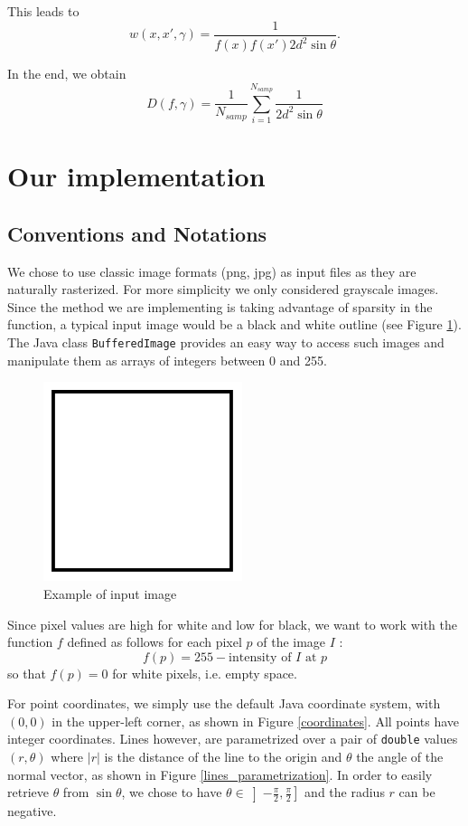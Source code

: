 \documentclass[10pt,a4paper]{article}                        %
\begin{document}
This leads to $$ w(x, x',\gamma) = \frac{1}{f(x)f(x')2d^2\sin\theta}. $$

In the end, we obtain
\begin{equation}
D(f,\gamma) = \frac{1}{N_{samp}} \sum_{i=1}^{N_{samp}}\frac{1}{2d^2\sin\theta}
\label{equation_finale}
\end{equation} 

        
        \section{Our implementation}

        \subsection {Conventions and Notations}
We chose to use classic image formats (png, jpg) as input files as they are naturally rasterized. For more simplicity we only considered grayscale images. Since the method we are implementing is taking advantage of sparsity in the function, a typical input image would be a black and white outline (see Figure \ref{exemple_carre}). The Java class \texttt{BufferedImage} provides an easy way to access such images and manipulate them as arrays of integers between 0 and 255. 
\begin{figure}[h]
\begin{center}
\includegraphics[scale=0.5]{img/carre.png}
\caption{Example of input image}
\label{exemple_carre}
\end{center}
\end{figure}

Since pixel values are high for white and low for black, we want to work with the function $f$ defined as follows for each pixel $p$ of the image $I$ :
\[f(p) = 255 - \text{intensity of $I$ at $p$}\]
so that $f(p)=0$ for white pixels, i.e. empty space.

For point coordinates, we simply use the default Java coordinate system, with $(0,0)$ in the upper-left corner, as shown in Figure \ref{coordinates}. All points have integer coordinates. Lines however, are parametrized over a pair of \texttt{double} values $(r,\theta)$ where $|r|$ is the distance of the line to the origin and $\theta$ the angle of the normal vector, as shown in Figure \ref{lines_parametrization}. In order to easily retrieve $\theta$ from $\sin\theta$, we chose to have $\theta\in\left]-\frac{\pi}{2},\frac{\pi}{2}\right]$ and the radius $r$ can be negative.
\end{document}

